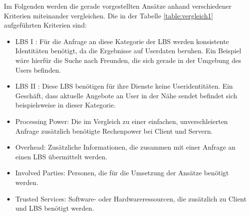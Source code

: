 Im Folgenden werden die gerade vorgestellten Ansätze anhand verschiedener Kriterien miteinander vergleichen. Die in der Tabelle \ref{table:vergleich1} aufgeführten Kriterien sind:
\begin{itemize}
	\item LBS I \cite{Chow2011}: Für die Anfrage an diese Kategorie der LBS werden konsistente Identitäten benötigt, da die Ergebnisse auf Userdaten beruhen. Ein Beispiel wäre hierfür die Suche nach Freunden, die sich gerade in der Umgebung des Users befinden.
	\item LBS II \cite{Chow2011}: Diese LBS benötigen für ihre Dienste keine Useridentitäten. Ein Geschäft, dass aktuelle Angebote an User in der Nähe sendet befindet sich beispielsweise in dieser Kategorie.
	\item Processing Power: Die im Vergleich zu einer einfachen, unverschleierten Anfrage zusätzlich benötigte Rechenpower bei Client und Servern.
	\item Overhead: Zusätzliche Informationen, die zusammen mit einer Anfrage an einen LBS übermittelt werden.
	\item Involved Parties: Personen, die für die Umsetzung der Ansätze benötigt werden.
	\item Trusted Services: Software- oder Hardwareressourcen, die zusätzlich zu Client und LBS benötigt werden.
\end{itemize}

